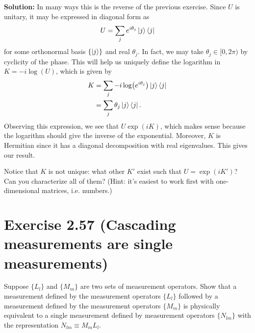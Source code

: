 \documentclass{book}
\begin{document}
    \textbf{Solution:} In many ways this is the reverse of the previous exercise. Since $U$ is unitary, it may be expressed in diagonal form as 
    \begin{align}
        U = \sum_{j} e^{i \theta_j} \ket{j}\bra{j}
    \end{align}
    for some orthonormal basis $\{\ket{j}\}$ and real $\theta_j$. In fact, we may take $\theta_j \in [0, 2\pi)$ by cyclicity of the phase. This will help us uniquely define the logarithm in $K = -i \log(U)$, which is given by
    \begin{align}
    \begin{aligned}
        K &= \sum_j -i \log(e^{i \theta_j}) \ket{j}\bra{j} \\
        &= \sum_j \theta_j \ket{j}\bra{j}.
    \end{aligned}
    \end{align}
    Observing this expression, we see that $U \exp(iK)$, which makes sense because the logarithm should give the inverse of the exponential. Moreover, $K$ is Hermitian since it has a diagonal decomposition with real eigenvalues. This gives our result.
    
    Notice that $K$ is not unique: what other $K'$ exist such that $U = \exp(iK')$? Can you characterize all of them? (Hint: it's easiest to work first with one-dimensional matrices, i.e. numbers.)
    
\section*{Exercise 2.57 (Cascading measurements are single measurements)}
	Suppose $\{L_l\}$ and $\{M_m\}$ are two sets of measurement operators. Show that a measurement defined by the measurement operators $\{L_l\}$ followed by a measurement defined by the measurement operators $\{M_m\}$ is physically equivalent to a single measurement defined by measurement operators $\{N_{lm}\}$ with the representation $N_{lm} \equiv M_m L_l$.
	
\end{document}
